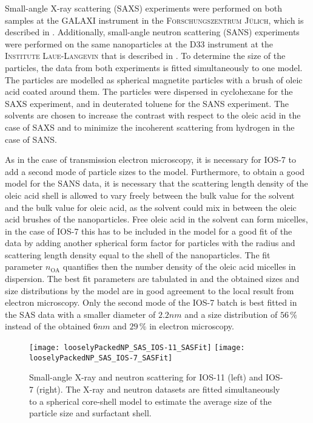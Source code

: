 \documentclass[\main/dresen_thesis.tex]{subfiles}
\begin{document}
  Small-angle X-ray scattering (SAXS) experiments were performed on both samples at the \textsc{GALAXI} instrument in the \textsc{Forschungszentrum J\"ulich}, which is described in .
  Additionally, small-angle neutron scattering (SANS) experiments were performed on the same nanoparticles at the \textsc{D33} instrument at the \textsc{Institute Laue-Langevin} that is described in .
  To determine the size of the particles, the data from both experiments is fitted simultaneously to one model.
  The particles are modelled as spherical magnetite particles with a brush of oleic acid coated around them.
  The particles were dispersed in cyclohexane for the SAXS experiment, and in deuterated toluene for the SANS experiment.
  The solvents are chosen to increase the contrast with respect to the oleic acid in the case of SAXS and to minimize the incoherent scattering from hydrogen in the case of SANS.

  As in the case of transmission electron microscopy, it is necessary for IOS-7 to add a second mode of particle sizes to the model.
  Furthermore, to obtain a good model for the SANS data, it is necessary that the scattering length density of the oleic acid shell is allowed to vary freely between the bulk value for the solvent and the bulk value for oleic acid, as the solvent could mix in between the oleic acid brushes of the nanoparticles.
  Free oleic acid in the solvent can form micelles, in the case of IOS-7 this has to be included in the model for a good fit of the data by adding another spherical form factor for particles with the radius and scattering length density equal to the shell of the nanoparticles.
  The fit parameter $n_\mathrm{OA}$ quantifies then the number density of the oleic acid micelles in dispersion.
  The best fit parameters are tabulated in  and the obtained sizes and size distributions by the model are in good agreement to the local result from electron microscopy.
  Only the second mode of the IOS-7 batch is best fitted in the SAS data with a smaller diameter of $2.2 \unit{nm}$ and a size distribution of $56\,\%$ instead of the obtained $6 \unit{nm}$ and $29\,\%$ in electron microscopy.

  \begin{figure}[tb]
    \centering
    \texttt{[image: looselyPackedNP\_SAS\_IOS-11\_SASFit]}
    \texttt{[image: looselyPackedNP\_SAS\_IOS-7\_SASFit]}
    \caption{\label{fig:looselyPackedNP:nanoparticle:sas}Small-angle X-ray and neutron scattering for IOS-11 (left) and IOS-7 (right). The X-ray and neutron datasets are fitted simultaneously to a spherical core-shell model to estimate the average size of the particle size and surfactant shell.}
  \end{figure}
\end{document}
